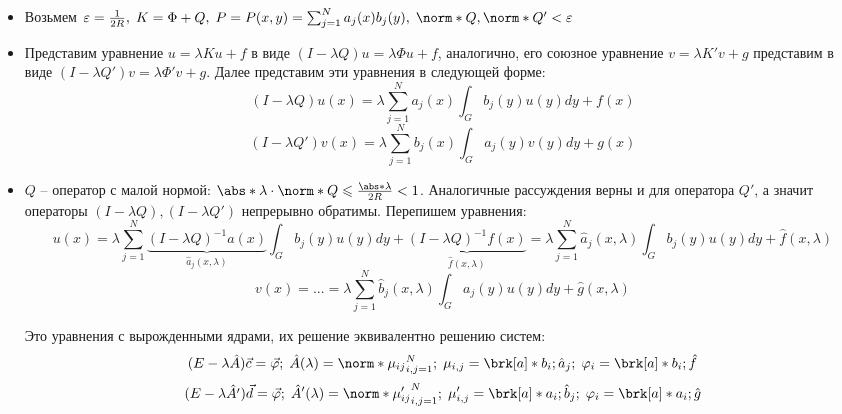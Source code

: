 \begin{itemize}
  \item Возьмем $\varepsilon = \frac{1}{2R}, \; K = \Phi + Q, \; P = P(x,y)=\sum_{j = 1}^{N} a_{j}(x)b_{j}(y), \; \norm*{Q}, \norm*{Q'} < \varepsilon$
  \item Представим уравнение $u = \lambda Ku +f$ в виде $(I -\lambda Q)u = \lambda \Phi u + f$, аналогично, его союзное уравнение $v = \lambda K'v +g$ представим в виде $(I -\lambda Q')v = \lambda \Phi' v + g$. Далее представим эти уравнения в следующей форме:
  $$ (I - \lambda Q)u(x) = \lambda \sum_{j = 1}^{N}a_{j}(x)\int_{G}b_{j}(y)u(y)dy + f(x)$$
  $$ (I - \lambda Q')v(x) = \lambda \sum_{j = 1}^{N}b_{j}(x)\int_{G}a_{j}(y)v(y)dy + g(x)$$
  \item $Q$ -- оператор с малой нормой: $\abs*{\lambda}\cdot\norm*{Q} \leq \frac{\abs*{\lambda}}{2R} < 1$. Аналогичные рассуждения верны и для оператора $Q'$, а значит операторы $(I - \lambda Q), (I - \lambda Q')$ непрерывно обратимы. Перепишем уравнения:
  $$u(x) = \lambda \sum_{j = 1}^{N}\underbrace{(I - \lambda Q)^{-1}a(x)}_{\hat{a}_{j}(x,\lambda)}\int_{G}b_{j}(y)u(y)dy + \underbrace{(I - \lambda Q)^{-1}f(x)}_{\hat{f}(x, \lambda)} = \lambda \sum_{j = 1}^{N}\hat{a}_{j}(x,\lambda)\int_{G}b_{j}(y)u(y)dy + \hat{f}(x,\lambda)$$
  $$v(x) = ... = \lambda \sum_{j = 1}^{N}\hat{b}_{j}(x,\lambda)\int_{G}a_{j}(y)u(y)dy + \hat{g}(x,\lambda)$$
  
  Это уравнения с вырожденными ядрами, их решение эквивалентно решению систем:
  $$(E - \lambda \hat{A})\vec{c} = \vec{\varphi}; \; \hat{A}(\lambda) = \norm*{\mu_{ij}}_{i,j=1}^{N}; \; \mu_{i,j} = \brk[a]*{b_{i}; \hat{a}_{j}}; \; \varphi_{i} = \brk[a]*{b_{i}; \hat{f}}$$
  $$(E - \lambda \hat{A'})\vec{d} = \vec{\phi}; \; \hat{A}'(\lambda) = \norm*{\mu'_{ij}}_{i,j=1}^{N}; \; \mu'_{i,j} = \brk[a]*{a_{i}; \hat{b}_{j}}; \; \phi_{i} = \brk[a]*{a_{i}; \hat{g}}$$
  

\end{itemize}
